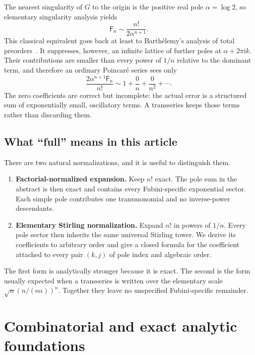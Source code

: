 \documentclass[11pt,a4paper]{article}
\theoremstyle{definition}
\theoremstyle{remark}
\newcommand{\Fub}{\mathsf F}
\newcommand{\e}{\mathrm e}
\newcommand{\ii}{\mathrm i}
\begin{document}
The nearest singularity of \(G\) to the origin is the positive real pole
\(\alpha=\log 2\), so elementary singularity analysis
\cite[Chap.~IV]{FlajoletSedgewick} yields
\begin{equation}\label{eq:leading}
 \Fub_n\sim \frac{n!}{2\alpha^{n+1}}.
\end{equation}
This classical equivalent goes back at least to Barth\'elemy's analysis of
total preorders~\cite{Barthelemy}.  It suppresses, however, an infinite lattice
of further poles at \(\alpha+2\pi\ii k\).  Their contributions are smaller than
every power of \(1/n\) relative to the dominant term, and therefore an ordinary
Poincar\'e series sees only
\[
 \frac{2\alpha^{n+1}\Fub_n}{n!}
 \sim 1+\frac0n+\frac0{n^2}+\cdots.
\]
The zero coefficients are correct but incomplete: the actual error is a
structured sum of exponentially small, oscillatory terms.  A transseries keeps
those terms rather than discarding them.

\subsection{What ``full'' means in this article}

There are two natural normalizations, and it is useful to distinguish them.

\begin{enumerate}
\item \textbf{Factorial-normalized expansion.}
      Keep \(n!\) exact.  The pole sum in the abstract is then exact and contains
      every Fubini-specific exponential sector.  Each simple pole contributes
      one transmonomial and no inverse-power descendants.
\item \textbf{Elementary Stirling normalization.}
      Expand \(n!\) in powers of \(1/n\).  Every pole sector then inherits the
      same universal Stirling tower.  We derive its coefficients to arbitrary
      order and give a closed formula for the coefficient attached to every
      pair \((k,j)\) of pole index and algebraic order.
\end{enumerate}

The first form is analytically stronger because it is exact.  The second is the
form usually expected when a transseries is written over the elementary scale
\(
 \sqrt{n}(n/(\e\alpha))^n
\).
Together they leave no unspecified Fubini-specific remainder.

\section{Combinatorial and exact analytic foundations}
\end{document}
